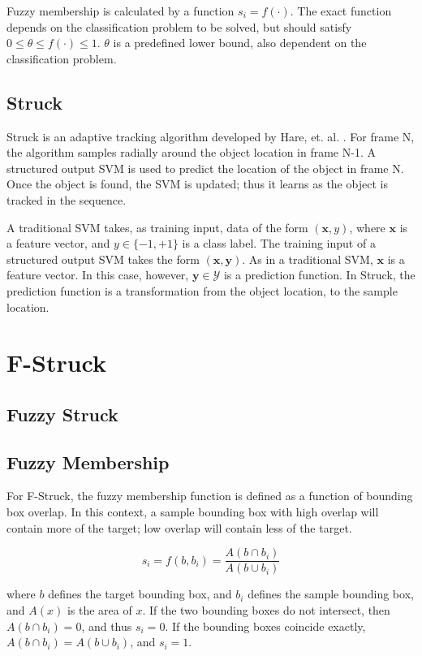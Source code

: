 \documentclass{IEEEtran}
\begin{document}
Fuzzy membership is calculated by a function \(s_i = f(\cdot)\). The exact function depends on the
classification problem to be solved, but should satisfy \(0 \le \theta \le f(\cdot) \le 1\).
\(\theta\) is a predefined lower bound, also dependent on the classification problem.

\subsection{Struck} %
Struck is an adaptive tracking algorithm developed by Hare, et. al. \cite{6126251}. For frame N, the
algorithm samples radially around the object location in frame N-1. A structured output SVM is used
to predict the location of the object in frame N. Once the object is found, the SVM is updated; thus
it learns as the object is tracked in the sequence.

A traditional SVM takes, as training input, data of the form \((\textbf{x}, y)\), where
\(\textbf{x}\) is a feature vector, and \(y \in \{-1, +1\}\) is a class label. The training input of
a structured output SVM takes the form \((\textbf{x}, \textbf{y})\). As in a traditional SVM,
\(\textbf{x}\) is a feature vector. In this case, however, \(\textbf{y} \in \mathcal{Y}\) is a prediction
function. In Struck, the prediction function is a transformation from the object location, to the
sample location.

\section{F-Struck}

\subsection{Fuzzy Struck}

\subsection{Fuzzy Membership}
For F-Struck, the fuzzy membership function is defined as a function of bounding box overlap. In
this context, a sample bounding box with high overlap will contain more of the target; low overlap
will contain less of the target.

\begin{displaymath}
    s_i = f\left(b, b_i\right) = \frac{A(b \cap b_i)}{A(b \cup b_i)}
\end{displaymath}

where \(b\) defines the target bounding box, and \(b_i\) defines the sample bounding box, and
\(A(x)\) is the area of \(x\). If the two bounding boxes do not intersect, then \(A\left(b \cap
b_i\right) = 0\), and thus \(s_i = 0\). If the bounding boxes coincide exactly,
\(A\left(b \cap b_i\right) = A\left(b \cup b_i\right)\), and \(s_i = 1\).
\end{document}
